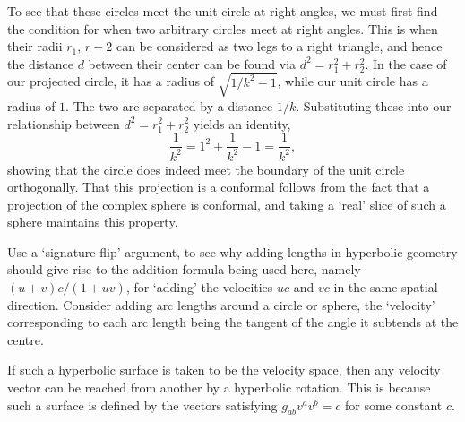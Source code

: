 \documentclass[../road-to-reality.tex]{subfiles}
\begin{document}
\begin{questions}
\begin{solution}
    To see that these circles meet the unit circle at right angles, we must first find the condition for when two arbitrary circles meet at right angles. This is when their radii $r_1$, $r-2$ can be considered as two legs to a right triangle, and hence the distance $d$ between their center can be found via $d^2 = r_1^2 + r_2^2$. In the case of our projected circle, it has a radius of $\sqrt{1/k^2 - 1}$, while our unit circle has a radius of $1$. The two are separated by a distance $1/k$. Substituting these into our relationship between $d^2 = r_1^2 + r_2^2$ yields an identity,
    \[
      \frac{1}{k^2} = 1^2 + \frac{1}{k^2} - 1 = \frac{1}{k^2},
    \]
    showing that the circle does indeed meet the boundary of the unit circle
    orthogonally. That this projection is a conformal follows from the fact that
    a projection of the complex sphere is conformal, and taking a `real' slice
    of such a sphere maintains this property.
  \end{solution}

\question Use a `signature-flip' argument, to see why adding lengths in hyperbolic geometry should give rise to the addition formula being used here, namely $(u+v)c/(1+uv)$, for `adding' the velocities $uc$ and $vc$ in the same spatial direction. Consider adding arc lengths around a circle or sphere, the `velocity' corresponding to each arc length being the tangent of the angle it subtends at the centre.

  \begin{solution}
    If such a hyperbolic surface is taken to be the velocity space, then any
    velocity vector can be reached from another by a hyperbolic rotation. This
    is because such a surface is defined by the vectors satisfying
    $g_{ab}v^av^b=c$ for some constant $c$.
    

\end{solution}
\end{questions}
\end{document}
